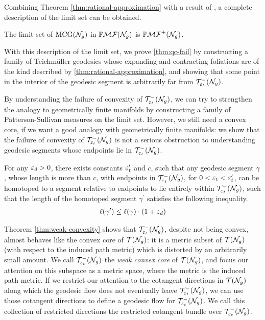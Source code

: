 Combining Theorem \ref{thm:rational-approximation} with a result of \textcite[Proposition 1]{lenzhen2010criteria}, a complete description of the limit set can be obtained.
\begin{theorem}
  The limit set of $\mathrm{MCG}(\mathcal{N}_g)$ in $\mathbb{P}\mathcal{MF}(\mathcal{N}_g)$ is $\mathbb{P}\mathcal{MF}^+(\mathcal{N}_g)$.
\end{theorem}

With this description of the limit set, we prove \autoref{thm:qc-fail} by constructing a family of Teichmüller geodesics whose expanding and contracting foliations are of the kind described by \autoref{thm:rational-approximation}, and showing that some point in the interior of the geodesic segment is arbitrarily far from $\mathcal{T}_{\varepsilon_t}^{-}(\mathcal{N}_g)$.

By understanding the failure of convexity of $\mathcal{T}_{\varepsilon_t}^{-}(\mathcal{N}_g)$, we can try to strengthen the analogy to geometrically finite manifolds by constructing a family of Patterson-Sullivan measures on the limit set.
However, we still need a convex core, if we want a good analogy with geometrically finite manifolds: we show that the failure of convexity of $\mathcal{T}_{\varepsilon_t}^{-}(\mathcal{N}_g)$ is not a serious obstruction to understanding geodesic segments whose endpoints lie in $\mathcal{T}_{\varepsilon_t}^{-}(\mathcal{N}_g)$.


\begingroup
\def\thetheorem{\ref{thm:weak-convexity}}
\begin{theorem}
For any $\varepsilon_d > 0$, there exists constants $\varepsilon_t^{\prime}$ and $c$, such that any geodesic segment $\gamma$, whose length is more than $c$, with endpoints in $\mathcal{T}_{\varepsilon_t}^{-}(\mathcal{N}_g)$, for $0 < \varepsilon_t < \varepsilon_t^{\prime}$, can be homotoped to a segment relative to endpoints to lie entirely within $\mathcal{T}_{\varepsilon_t}^{-}(\mathcal{N}_g)$, such that the length of the homotoped segment $\gamma^{\prime}$ satisfies the following inequality.
  \begin{align*}
    \ell(\gamma^{\prime}) \leq \ell(\gamma) \cdot (1 + \varepsilon_d)
  \end{align*}
\end{theorem}
\addtocounter{theorem}{-1}
\endgroup

Theorem \ref{thm:weak-convexity} shows that $\mathcal{T}_{\varepsilon_t}^{-}(\mathcal{N}_g)$, despite not being convex, almost behaves like the convex core of $\mathcal{T}(\mathcal{N}_g)$: it is a metric subset of $\mathcal{T}(\mathcal{N}_g)$ (with respect to the induced path metric) which is distorted by an arbitrarily small amount.
We call $\mathcal{T}_{\varepsilon_t}^{-}(\mathcal{N}_g)$ the \emph{weak convex core} of $\mathcal{T}(\mathcal{N}_g)$, and focus our attention on this subspace as a metric space, where the metric is the induced path metric.
If we restrict our attention to the cotangent directions in $\mathcal{T}(\mathcal{N}_g)$ along which the geodesic flow does not eventually leave $\mathcal{T}_{\varepsilon_t}^{-}(\mathcal{N}_g)$, we can use those cotangent directions to define a geodesic flow for $\mathcal{T}_{\varepsilon_t}^{-}(\mathcal{N}_g)$.
We call this collection of restricted directions the restricted cotangent bundle over $\mathcal{T}_{\varepsilon_t}^{-}(\mathcal{N}_g)$.

